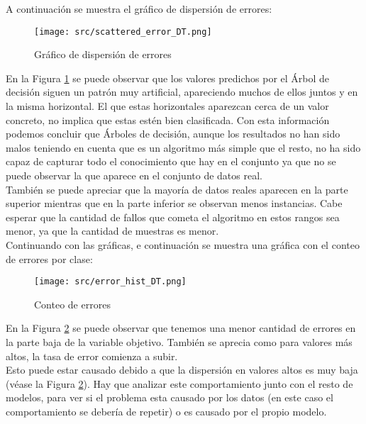 \pagebreak
A continuación se muestra el gráfico de dispersión de errores:
\begin{figure}[H]
	\centering
	\texttt{[image: src/scattered\_error\_DT.png]}
	\caption{Gráfico de dispersión de errores}
	\label{fig:tree_scattered}
\end{figure}
En la Figura \ref{fig:tree_scattered} se puede observar que los valores predichos por el Árbol de decisión siguen un patrón muy artificial, apareciendo muchos de ellos juntos y en la misma horizontal. El que estas horizontales aparezcan cerca de un valor concreto, no implica que estas estén bien clasificada.
Con esta información podemos concluir que Árboles de decisión, aunque los resultados no han sido malos teniendo en cuenta que es un algoritmo más simple que el resto, no ha sido capaz de capturar todo el conocimiento que hay en el conjunto ya que no se puede observar la  que aparece en el conjunto de datos real.\\
También se puede apreciar que la mayoría de datos reales aparecen en la parte superior mientras que en la parte inferior se observan menos instancias. Cabe esperar que la cantidad de fallos que cometa el algoritmo en estos rangos sea menor, ya que la cantidad de muestras es menor.\\
\clearpage
Continuando con las gráficas, e continuación se muestra una gráfica con el conteo de errores por clase:
\begin{figure}[H]
	\centering
	\texttt{[image: src/error\_hist\_DT.png]}
	\caption{Conteo de errores}
	\label{fig:tree_error_plot}
\end{figure}
En la Figura \ref{fig:tree_error_plot} se puede observar que tenemos una menor cantidad de errores en la parte baja de la variable objetivo. También se aprecia como para valores más altos, la tasa de error comienza a subir. \\Esto puede estar causado debido a que la dispersión en valores altos es muy baja (véase la Figura \ref{fig:tree_error_plot}).
Hay que analizar este comportamiento junto con el resto de modelos, para ver si el problema esta causado por los datos (en este caso el comportamiento se debería de repetir) o es causado por el propio modelo.
\clearpage
